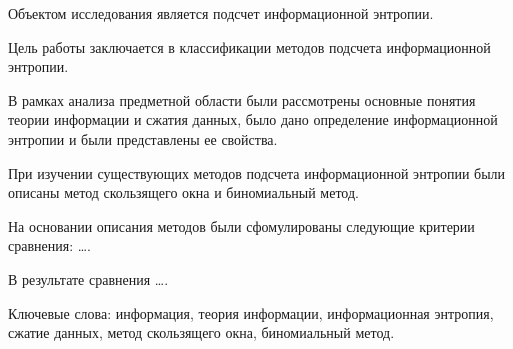 \begin{essay}{}

Объектом исследования является подсчет информационной энтропии.

Цель работы заключается в классификации методов подсчета информационной энтропии.

В рамках анализа предметной области были рассмотрены основные понятия теории информации и сжатия данных, было дано определение информационной энтропии и были представлены ее свойства.

При изучении существующих методов подсчета информационной энтропии были описаны метод скользящего окна и биномиальный метод.

На основании описания методов были сфомулированы следующие критерии сравнения: \ldots.

В результате сравнения \ldots.

Ключевые слова: информация, теория информации, информационная энтропия, сжатие данных, метод скользящего окна, биномиальный метод.

\end{essay}